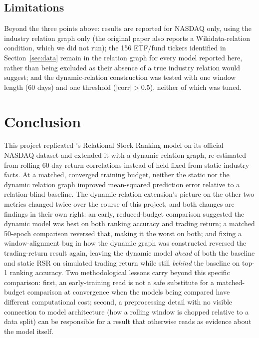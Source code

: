 \documentclass[12pt]{article}
\begin{document}
\subsection{Limitations}

Beyond the three points above: results are reported for NASDAQ only, using the industry relation
graph only (the original paper also reports a Wikidata-relation condition, which we did not run);
the 156 ETF/fund tickers identified in Section~\ref{sec:data} remain in the relation graph for
every model reported here, rather than being excluded as their absence of a true industry relation
would suggest; and the dynamic-relation construction was tested with one window length (60 days)
and one threshold ($|\text{corr}|>0.5$), neither of which was tuned.


\section{Conclusion}
\label{sec:conclusion}

This project replicated \citet{feng2019temporal}'s Relational Stock Ranking model on its official
NASDAQ dataset and extended it with a dynamic relation graph, re-estimated from rolling 60-day
return correlations instead of held fixed from static industry facts. At a matched, converged
training budget, neither the static nor the dynamic relation graph improved mean-squared
prediction error relative to a relation-blind baseline. The dynamic-relation extension's picture
on the other two metrics changed twice over the course of this project, and both changes are
findings in their own right: an early, reduced-budget comparison suggested the dynamic model was
best on both ranking accuracy and trading return; a matched 50-epoch comparison reversed that,
making it the worst on both; and fixing a window-alignment bug in how the dynamic graph was
constructed reversed the trading-return result again, leaving the dynamic model \emph{ahead} of
both the baseline and static RSR on simulated trading return while still \emph{behind} the
baseline on top-1 ranking accuracy. Two methodological lessons carry beyond this specific
comparison: first, an early-training read is not a safe substitute for a matched-budget comparison
at convergence when the models being compared have different computational cost; second, a
preprocessing detail with no visible connection to model architecture (how a rolling window is
chopped relative to a data split) can be responsible for a result that otherwise reads as evidence
about the model itself.
\end{document}
